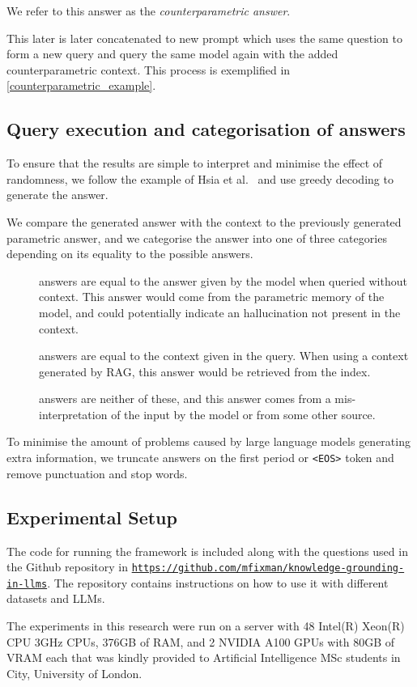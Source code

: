 We refer to this answer as the \emph{counterparametric answer}.

This later is later concatenated to new prompt which uses the same question to form a new query and query the same model again with the added counterparametric context.
This process is exemplified in \cref{counterparametric_example}.

\subsection{Query execution and categorisation of answers}

To ensure that the results are simple to interpret and minimise the effect of randomness, we follow the example of Hsia et al.~\cite{ragged} and use greedy decoding to generate the answer.

We compare the generated answer with the context to the previously generated parametric answer, and we categorise the answer into one of three categories depending on its equality to the possible answers.

\begin{description}
	\item[\Parametric{}] answers are equal to the answer given by the model when queried without context.
		This answer would come from the parametric memory of the model, and could potentially indicate an hallucination not present in the context.
	\item[\Contextual{}] answers are equal to the context given in the query.
		When using a context generated by RAG, this answer would be retrieved from the index.
	\item[\Other] answers are neither of these, and this answer comes from a mis-interpretation of the input by the model or from some other source.
\end{description}

To minimise the amount of problems caused by large language models generating extra information, we truncate answers on the first period or \texttt{<EOS>} token and remove punctuation and stop words.


\subsection{Experimental Setup}

The code for running the framework is included along with the questions used in the Github repository in \texttt{\url{https://github.com/mfixman/knowledge-grounding-in-llms}}.
The repository contains instructions on how to use it with different datasets and LLMs.

The experiments in this research were run on a server with 48 Intel(R) Xeon(R) CPU 3GHz CPUs, 376GB of RAM, and 2 NVIDIA A100 GPUs with 80GB of VRAM each that was kindly provided to Artificial Intelligence MSc students in City, University of London.
